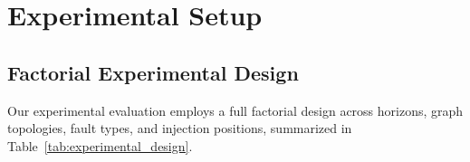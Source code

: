 \section{Experimental Setup}
\label{sec:experimental_setup}

\subsection{Factorial Experimental Design}
Our experimental evaluation employs a full factorial design across horizons, graph topologies, fault types, and injection positions, summarized in Table~\ref{tab:experimental_design}.




